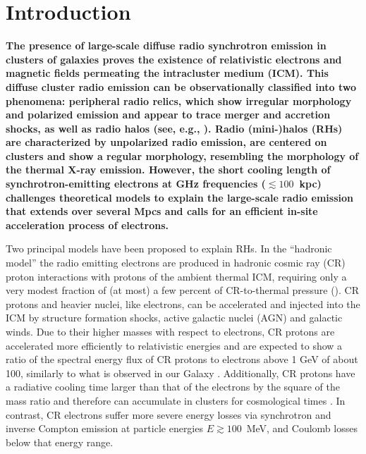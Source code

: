 \documentclass[useAMS,usenatbib]{mn2e}
\begin{document}
\section{Introduction}
\label{sec:1}

{\bf The presence of large-scale diffuse radio synchrotron emission in clusters
  of galaxies proves the existence of relativistic electrons and magnetic fields
  permeating the intracluster medium (ICM). This diffuse cluster radio emission
  can be observationally classified into two phenomena: peripheral radio relics,
  which show irregular morphology and polarized emission and appear to trace
  merger and accretion shocks, as well as radio halos (see, e.g.,
  \citealp{2012A&ARv..20...54F}).  Radio \mbox{(mini-)}halos (RHs) are
  characterized by unpolarized radio emission, are centered on clusters and
  show a regular morphology, resembling the morphology of the thermal X-ray
  emission. However, the short cooling length of synchrotron-emitting electrons
  at GHz frequencies ($\lesssim 100$~kpc) challenges theoretical models to
  explain the large-scale radio emission that extends over several Mpcs and
  calls for an efficient in-site acceleration process of electrons.}

Two principal models have been proposed to explain RHs.  In the ``hadronic
model'' the radio emitting electrons are produced in hadronic cosmic ray (CR)
proton interactions with protons of the ambient thermal ICM, requiring only a
very modest fraction of (at most) a few percent of CR-to-thermal pressure
(\citealp{1980ApJ...239L..93D,1982AJ.....87.1266V, 1999APh....12..169B,
  2000A&A...362..151D, 2001ApJ...562..233M,2001ApJ...559...59M,
  2003MNRAS.342.1009M,2003A&A...407L..73P, 2004A&A...413...17P,
  2004MNRAS.352...76P, 2007IJMPA..22..681B, 2008MNRAS.385.1211P,
  2008MNRAS.385.1242P, 2009JCAP...09..024K, 2010MNRAS.401...47D,
  2010arXiv1003.0336D, 2010arXiv1003.1133K, 2010arXiv1011.0729K,
  2011A&A...527A..99E}).  CR protons and heavier nuclei, like electrons, can be
accelerated and injected into the ICM by structure formation shocks, active
galactic nuclei (AGN) and galactic winds.  Due to their higher masses with
respect to electrons, CR protons are accelerated more efficiently to
relativistic energies and are expected to show a ratio of the spectral energy
flux of CR protons to electrons above 1 GeV of about 100, similarly to what is
observed in our Galaxy \citep{2002cra..book.....S}. Additionally, CR protons
have a radiative cooling time larger than that of the electrons by the square of
the mass ratio and therefore can accumulate in clusters for cosmological times
\citep{1996SSRv...75..279V}. In contrast, CR electrons suffer more severe energy
losses via synchrotron and inverse Compton emission at particle energies $E
\gtrsim 100$~MeV, and Coulomb losses below that energy range.
\end{document}
